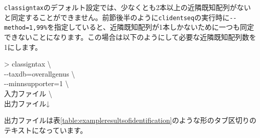 \documentclass[titlepage,10pt,a4paper]{jsbook}
\newenvironment{cmd}{\begin{oframed}\raggedright\ttfamily\footnotesize\setlength{\baselineskip}{1.4em}}{\end{oframed}\vspace{-1em}}
\begin{document}
\texttt{classigntax}のデフォルト設定では、少なくとも2本以上の近隣既知配列がないと同定することができません。前節後半のように\texttt{clidentseq}の実行時に\texttt{{-}{-}method=1,99\%}を指定していると、近隣既知配列が1本しかないために一つも同定できないことになります。この場合は以下のようにして必要な近隣既知配列数を1にします。
\begin{cmd}
{\textgreater} classigntax {\textbackslash}\\
{-}{-}taxdb=overall{\textunderscore}genus {\textbackslash}\\
{-}{-}minnsupporter=1 {\textbackslash}\\
入力ファイル {\textbackslash}\\
出力ファイル↓
\end{cmd}
出力ファイルは表\ref{table:exampleresultsofidentification}のような形のタブ区切りのテキストになっています。
\end{document}
